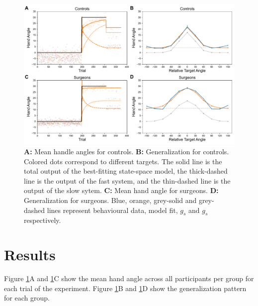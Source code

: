\documentclass[man, 11pt, longtable, floatsintext, notab]{apa6}
\begin{document}
\begin{figure}[t]
  \centering
  \includegraphics[width=1.0\textwidth]{figures/fig_2.pdf}
  \caption{\scriptsize
   \textbf{A:} Mean handle angles for controls.
   \textbf{B:} Generalization for controls. Colored dots
   correspond to different targets. The solid line is the total
   output of the best-fitting state-space model, the
   thick-dashed line is the output of the fast system, and the
   thin-dashed line is the output of the slow sytem.
   \textbf{C:} Mean hand angle for surgeons.
   \textbf{D:} Generalization for surgeons. Blue, orange,
   grey-solid and grey-dashed lines represent behavioural data,
   model fit, $g_s$ and $g_s$ respectively.
   }
   \label{fig_results}
\end{figure}
\section{Results}
Figure \ref{fig_results}A and \ref{fig_results}C show the
mean hand angle across all participants per group for each
trial of the experiment. Figure \ref{fig_results}B and
\ref{fig_results}D show the generalization pattern for each
group.
\end{document}
